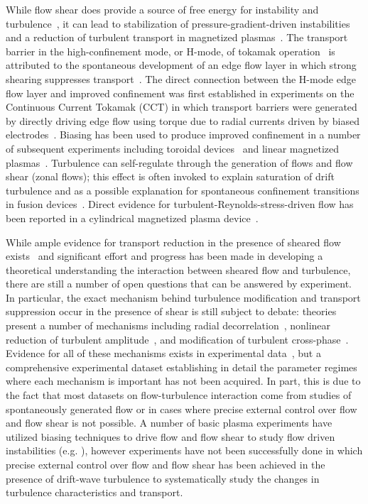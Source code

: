 \documentclass[aps,prl,amsmath,amssymb,preprint,superscriptaddress]{revtex4}
\begin{document}

While flow shear does provide a source of free energy for instability and turbulence~\cite{}, it can lead to stabilization of pressure-gradient-driven instabilities and a reduction of turbulent transport in magnetized plasmas~\cite{burrell97, terry00}.  The transport barrier in the high-confinement mode, or H-mode, of tokamak operation~\cite{wagner82} is attributed to the spontaneous development of an edge flow layer in which  strong shearing suppresses transport~\cite{burrell97, terry00, hahm?}.  The direct connection between the H-mode edge flow layer and improved confinement was first established in experiments on the Continuous Current Tokamak (CCT) in which transport barriers were generated by directly driving edge flow using torque due to radial currents driven by biased electrodes~\cite{taylor89,tynan92}.  Biasing has been used to produce improved confinement in a number of subsequent experiments including toroidal devices~\cite{weynants92,boedo00,silva06,craig97,chapman98,shats00} and linear magnetized plasmas~\cite{sakai93,maggs07,carter09}.  
Turbulence can self-regulate through the generation of flows and flow
shear (zonal flows); this effect is often invoked to explain
saturation of drift turbulence and as a possible explanation for
spontaneous confinement transitions in fusion
devices~\cite{terry00,diamond05}.  Direct evidence for
turbulent-Reynolds-stress-driven flow has been reported in a
cylindrical magnetized plasma device~\cite{holland06}. 


While ample evidence for transport reduction in the presence of
sheared flow exists~\cite{Burrell:1999, tynan09} and significant
effort and progress has been made in developing a theoretical
understanding the interaction between sheared flow and turbulence,
there are still a number of open questions that can be answered by
experiment.  In particular, the exact mechanism behind turbulence
modification and transport suppression occur in the presence of shear
is still subject to debate: theories present a number of mechanisms
including radial decorrelation~\cite{biglari90}, nonlinear reduction of
turbulent amplitude~\cite{Kim:2004}, and modification of turbulent
cross-phase~\cite{ware96}.  Evidence for all of these mechanisms exists in
experimental data~\cite{tynan09}, but a comprehensive experimental
dataset establishing in detail the parameter regimes where each
mechanism is important has not been acquired.  In part, this is due to
the fact that most datasets on flow-turbulence interaction come from
studies of spontaneously generated flow or in cases where precise
external control over flow and flow shear is not possible.  A number
of basic plasma experiments have utilized biasing techniques to drive
flow and flow shear to study flow driven
instabilities (e.g. \cite{amatucci96,jass70}),
however experiments have not been successfully done in which precise external
control over flow and flow shear has been achieved in the presence of
drift-wave turbulence to systematically study the changes in
turbulence characteristics and transport.
\end{document}
